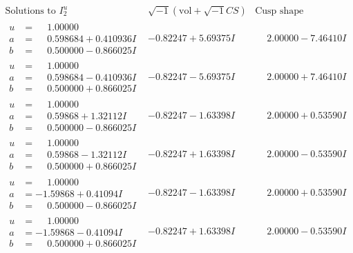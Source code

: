 \documentclass[1p]{elsarticle_modified}
\theoremstyle{definition}
\newcommand{\I}{\sqrt{-1}}
\begin{document}
$$\begin{array}{c|c|c}  
\text{Solutions to }I^u_{2}& \I (\text{vol} + \sqrt{-1}CS) & \text{Cusp shape}\\
 \hline 
\begin{aligned}
u &= \phantom{-}1.00000\phantom{ +0.000000I} \\
a &= \phantom{-}0.598684 + 0.410936 I \\
b &= \phantom{-}0.500000 - 0.866025 I\end{aligned}
 & -0.82247 + 5.69375 I & \phantom{-}2.00000 - 7.46410 I \\ \hline\begin{aligned}
u &= \phantom{-}1.00000\phantom{ +0.000000I} \\
a &= \phantom{-}0.598684 - 0.410936 I \\
b &= \phantom{-}0.500000 + 0.866025 I\end{aligned}
 & -0.82247 - 5.69375 I & \phantom{-}2.00000 + 7.46410 I \\ \hline\begin{aligned}
u &= \phantom{-}1.00000\phantom{ +0.000000I} \\
a &= \phantom{-}0.59868 + 1.32112 I \\
b &= \phantom{-}0.500000 - 0.866025 I\end{aligned}
 & -0.82247 - 1.63398 I & \phantom{-}2.00000 + 0.53590 I \\ \hline\begin{aligned}
u &= \phantom{-}1.00000\phantom{ +0.000000I} \\
a &= \phantom{-}0.59868 - 1.32112 I \\
b &= \phantom{-}0.500000 + 0.866025 I\end{aligned}
 & -0.82247 + 1.63398 I & \phantom{-}2.00000 - 0.53590 I \\ \hline\begin{aligned}
u &= \phantom{-}1.00000\phantom{ +0.000000I} \\
a &= -1.59868 + 0.41094 I \\
b &= \phantom{-}0.500000 - 0.866025 I\end{aligned}
 & -0.82247 - 1.63398 I & \phantom{-}2.00000 + 0.53590 I \\ \hline\begin{aligned}
u &= \phantom{-}1.00000\phantom{ +0.000000I} \\
a &= -1.59868 - 0.41094 I \\
b &= \phantom{-}0.500000 + 0.866025 I\end{aligned}
 & -0.82247 + 1.63398 I & \phantom{-}2.00000 - 0.53590 I \\ \hline\begin{aligned}

\end{aligned}
\end{array}$$
\end{document}
